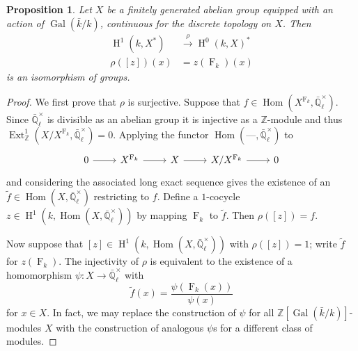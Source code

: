 \documentclass[11pt]{amsart}
\theoremstyle{plain}
\newtheorem{proposition}[theorem]{Proposition}
\theoremstyle{definition}
\theoremstyle{remark}
\newcommand{\ZZ}{{\mathbb{Z}}}
\newcommand{\EE}{\mathbb{\bar Q}_\ell}
\newcommand{\bFq}{\bar{k}}
\newcommand{\Fq}{k}
\newcommand{\EEx}{\EE^\times}
\DeclareMathOperator{\Gal}{Gal}
\newcommand{\Frob}[1]{\operatorname{F}_{#1}}
\DeclareMathOperator{\Hom}{Hom}
\DeclareMathOperator{\Ext}{Ext}
\DeclareMathOperator{\Hh}{H}
\begin{document}
\begin{proposition}\label{prop:X}
  Let $X$ be a finitely generated abelian group equipped with an
  action of $\Gal(\bFq/\Fq)$, continuous for the discrete topology on
  $X$.  Then
  \begin{align*}
    \Hh^1(\Fq, X^*) &\xrightarrow{\rho} \Hh^0(\Fq, X)^* \\
    \rho([z])(x) &= z(\Frob{\Fq})(x)
  \end{align*}
  is an isomorphism of groups.
\end{proposition}
\begin{proof}
  We first prove that $\rho$ is surjective.  Suppose that
  $f \in \Hom(X^{\Frob{\Fq}}, \EEx).$ Since $\EEx$ is divisible
  as an abelian group it is injective as a $\ZZ$-module and thus
  $\Ext^1_{\ZZ}(X/X^{\Frob{\Fq}}, \EEx) = 0$.  Applying the functor
  $\Hom(\mbox{---}, \EEx)$ to
  \[
  \begin{tikzcd}
  0 \rar & X^{\Frob{\Fq}} \rar & X \rar & X/X^{\Frob{\Fq}} \rar & 0
  \end{tikzcd}
  \]
  and considering the associated long exact sequence gives the
  existence of an $\tilde{f} \in \Hom(X, \EEx)$ restricting to
  $f$.  Define a $1$-cocycle $z \in \Hh^1(\Fq, \Hom(X,\EEx))$ by
  mapping $\Frob{\Fq}$ to $\tilde{f}$.  Then $\rho([z]) = f$.

  Now suppose that $[z] \in \Hh^1(\Fq,\Hom(X,\EEx))$ with
  $\rho([z]) = 1$; write $\tilde{f}$ for $z(\Frob{\Fq})$.  The injectivity
  of $\rho$ is equivalent to the existence of a homomorphism $\psi
  \colon X \rightarrow \EEx$ with
  $$\tilde{f}(x) = \frac{\psi(\Frob{\Fq}(x))}{\psi(x)}$$
  for $x \in X$.  In fact, we may replace the construction of $\psi$
  for all $\ZZ[\Gal(\bFq/\Fq)]$-modules $X$ with the construction of
  analogous $\psi$s for a different class of modules.


\end{proof}
\end{document}
